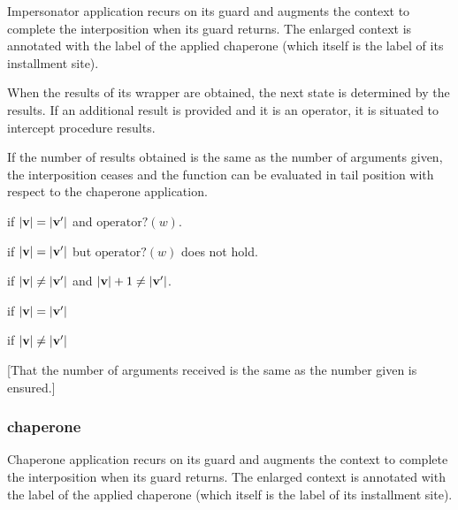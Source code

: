 \documentclass{sigplanconf}
\begin{document}
Impersonator application recurs on its guard and augments the context to complete the interposition when its guard returns.
The enlarged context is annotated with the label of the applied chaperone (which itself is the label of its installment site).


When the results of its wrapper are obtained, the next state is determined by the results.
If an additional result is provided and it is an operator, it is situated to intercept procedure results.

If the number of results obtained is the same as the number of arguments given, the interposition ceases and the function can be evaluated in tail position with respect to the chaperone application.


if $|\mathbf{v}|=|\mathbf{v'}|$ and $\mathrm{operator?}(w)$.

if $|\mathbf{v}|=|\mathbf{v'}|$ but $\mathrm{operator?}(w)$ does not hold.

if $|\mathbf{v}|\ne|\mathbf{v'}|$ and $|\mathbf{v}|+1\ne|\mathbf{v'}|$.







\red{\sval{\impcrk{\vv}::\ks}{\sigma}{\vvp}}{\sval{\ks}{\sigma}{\vvp}}
if $|\mathbf{v}|=|\mathbf{v'}|$

if $|\mathbf{v}|\ne|\mathbf{v'}|$

[That the number of arguments received is the same as the number given is ensured.]



\subsubsection{chaperone}

Chaperone application recurs on its guard and augments the context to complete the interposition when its guard returns.
The enlarged context is annotated with the label of the applied chaperone (which itself is the label of its installment site).
\end{document}
